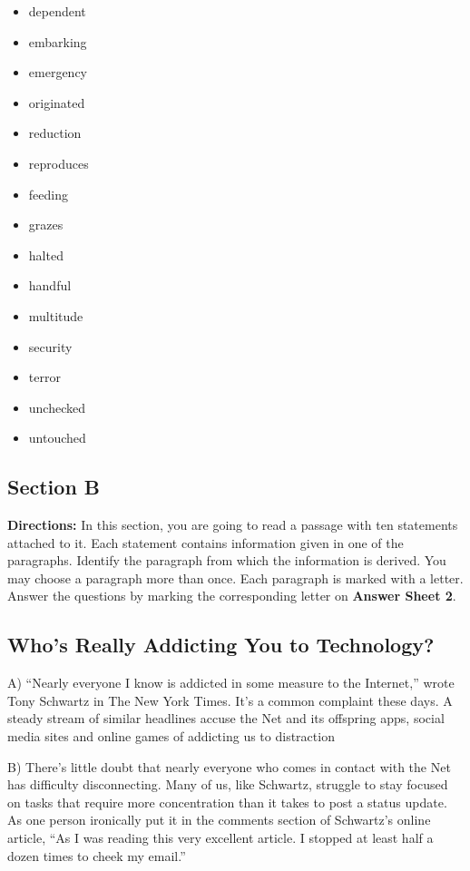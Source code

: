 \documentclass[UTF8,11pt]{ctexart}
\begin{document}
\begin{itemize}[leftmargin=2em,itemsep=.2em,topsep=.4em]\item[A.] dependent
\item[B.] embarking
\item[C.] emergency
\item[I.] originated
\item[J.] reduction
\item[K.] reproduces
\end{itemize}

\begin{itemize}[leftmargin=2em,itemsep=.2em,topsep=.4em]\item[D.] feeding
\item[E.] grazes
\item[F.] halted
\item[G.] handful
\item[H.] multitude
\item[L.] security
\item[M.] terror
\item[N.] unchecked
\item[O.] untouched
\end{itemize}

\subsection*{\textbf{Section B}}


\textbf{Directions:} In this section, you are going to read a passage with ten statements attached to it. Each statement contains information given in one of the paragraphs. Identify the paragraph from which the information is derived. You may choose a paragraph more than once. Each paragraph is marked with a letter. Answer the questions by marking the corresponding letter on\textbf{ Answer Sheet 2}.


\subsection*{\textbf{Who’s Really Addicting You to Technology?}}


A) “Nearly everyone I know is addicted in some measure to the Internet,” wrote Tony Schwartz in The New York Times. It’s a common complaint these days. A steady stream of similar headlines accuse the Net and its offspring apps, social media sites and online games of addicting us to distraction


B) There’s little doubt that nearly everyone who comes in contact with the Net has difficulty disconnecting. Many of us, like Schwartz, struggle to stay focused on tasks that require more concentration than it takes to post a status update. As one person ironically put it in the comments section of Schwartz's online article, “As I was reading this very excellent article. I stopped at least half a dozen times to cheek my email.”
\end{document}
